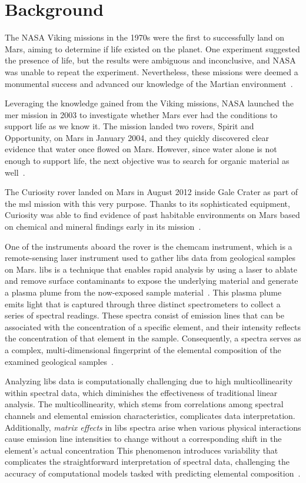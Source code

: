 \section{Background}\label{sec:background}
The NASA Viking missions in the 1970s were the first to successfully land on Mars, aiming to determine if life existed on the planet.
One experiment suggested the presence of life, but the results were ambiguous and inconclusive, and NASA was unable to repeat the experiment.
Nevertheless, these missions were deemed a monumental success and advanced our knowledge of the Martian environment~\cite{marsnasagov_vikings}.

Leveraging the knowledge gained from the Viking missions, NASA launched the \gls{mer} mission in 2003 to investigate whether Mars ever had the conditions to support life as we know it.
The mission landed two rovers, Spirit and Opportunity, on Mars in January 2004, and they quickly discovered clear evidence that water once flowed on Mars.
However, since water alone is not enough to support life, the next objective was to search for organic material as well~\cite{marsnasagov_observer, marsnasagov_spirit_opportunity}.

The Curiosity rover landed on Mars in August 2012 inside Gale Crater as part of the \gls{msl} mission with this very purpose.
Thanks to its sophisticated equipment, Curiosity was able to find evidence of past habitable environments on Mars based on chemical and mineral findings early in its mission~\cite{marsnasagov_msl}.

One of the instruments aboard the rover is the \gls{chemcam} instrument, which is a remote-sensing laser instrument used to gather \gls{libs} data from geological samples on Mars.
\gls{libs} is a technique that enables rapid analysis by using a laser to ablate and remove surface contaminants to expose the underlying material and generate a plasma plume from the now-exposed sample material~\cite{wiensChemcam2012}.
This plasma plume emits light that is captured through three distinct spectrometers to collect a series of spectral readings.
These spectra consist of emission lines that can be associated with the concentration of a specific element, and their intensity reflects the concentration of that element in the sample.
Consequently, a spectra serves as a complex, multi-dimensional fingerprint of the elemental composition of the examined geological samples~\cite{cleggRecalibrationMarsScience2017}.

Analyzing \gls{libs} data is computationally challenging due to high multicollinearity within spectral data, which diminishes the effectiveness of traditional linear analysis.
The multicollinearity, which stems from correlations among spectral channels and elemental emission characteristics, complicates data interpretation.
Additionally, \textit{matrix effects} in \gls{libs} spectra arise when various physical interactions cause emission line intensities to change without a corresponding shift in the element's actual concentration
This phenomenon introduces variability that complicates the straightforward interpretation of spectral data, challenging the accuracy of computational models tasked with predicting elemental composition~\cite{andersonImprovedAccuracyQuantitative2017}.

